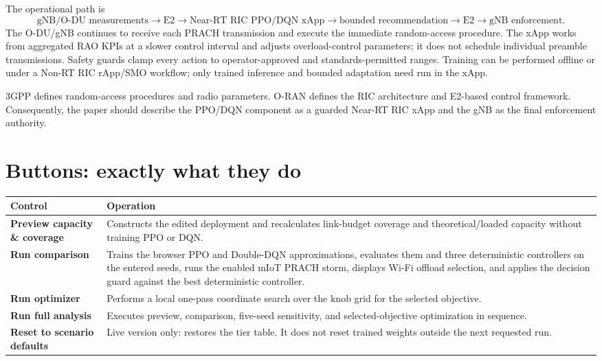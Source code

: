 \documentclass[10pt]{article}
\newcommand{\ui}[1]{\textsf{\textbf{#1}}}
\begin{document}
The operational path is
\[
\text{gNB/O-DU measurements}\rightarrow\text{E2}\rightarrow
\text{Near-RT RIC PPO/DQN xApp}\rightarrow\text{bounded recommendation}\rightarrow
\text{E2}\rightarrow\text{gNB enforcement}.
\]
The O-DU/gNB continues to receive each PRACH transmission and execute the immediate random-access procedure. The xApp works from aggregated RAO KPIs at a slower control interval and adjusts overload-control parameters; it does not schedule individual preamble transmissions. Safety guards clamp every action to operator-approved and standards-permitted ranges. Training can be performed offline or under a Non-RT RIC rApp/SMO workflow; only trained inference and bounded adaptation need run in the xApp.

3GPP defines random-access procedures and radio parameters. O-RAN defines the RIC architecture and E2-based control framework. Consequently, the paper should describe the PPO/DQN component as a guarded Near-RT RIC xApp and the gNB as the final enforcement authority.

\section{Buttons: exactly what they do}
\begin{tabular}{>{\raggedright\arraybackslash}p{}>{\raggedright\arraybackslash}p{}}
\toprule
Control & Operation\\
\midrule
\ui{Preview capacity \& coverage} & Constructs the edited deployment and recalculates link-budget coverage and theoretical/loaded capacity without training PPO or DQN.\\
\ui{Run comparison} & Trains the browser PPO and Double-DQN approximations, evaluates them and three deterministic controllers on the entered seeds, runs the enabled mIoT PRACH storm, displays Wi-Fi offload selection, and applies the decision guard against the best deterministic controller.\\
\ui{Run optimizer} & Performs a local one-pass coordinate search over the knob grid for the selected objective.\\
\ui{Run full analysis} & Executes preview, comparison, five-seed sensitivity, and selected-objective optimization in sequence.\\
\ui{Reset to scenario defaults} & Live version only: restores the tier table. It does not reset trained weights outside the next requested run.\\
\bottomrule
\end{tabular}
\end{document}
